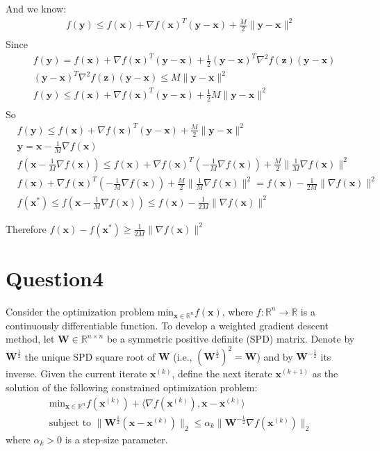 \documentclass{article}
\newcommand{\R}{\mathbb{R}}
\begin{document}
And we know:
\begin{align*}
    f(\bm{y}) \leq f(\bm{x}) + \nabla f(\bm{x})^T (\bm{y} - \bm{x}) + \frac{M}{2} \|\bm{y} - \bm{x}\|^2 \\
\end{align*}
Since 
\begin{align*}
    &f(\bm{y}) = f(\bm{x}) + \nabla f(\bm{x})^T (\bm{y} - \bm{x}) + \frac{1}{2} (\bm{y} - \bm{x})^T \nabla^2 f(\bm{z}) (\bm{y} - \bm{x}) \\
    &(\bm{y} - \bm{x})^T \nabla^2 f(\bm{z}) (\bm{y} - \bm{x}) \leq M \|\bm{y} - \bm{x}\|^2 \\
    &f(\bm{y}) \leq f(\bm{x}) + \nabla f(\bm{x})^T (\bm{y} - \bm{x}) + \frac{1}{2} M \|\bm{y} - \bm{x}\|^2  \\
\end{align*}
So
\begin{align*}
    &f(\bm{y}) \leq f(\bm{x}) + \nabla f(\bm{x})^T (\bm{y} - \bm{x}) + \frac{M}{2} \|\bm{y} - \bm{x}\|^2 \\
    & \bm{y} =  \bm{x} - \frac{1}{M} \nabla f(\bm{x}) \\
    & f(\bm{x} - \frac{1}{M} \nabla f(\bm{x})) \leq f(\bm{x}) + \nabla f(\bm{x})^T (- \frac{1}{M} \nabla f(\bm{x})) + \frac{M}{2} \|\frac{1}{M} \nabla f(\bm{x})\|^2 \\
    & f(\bm{x}) + \nabla f(\bm{x})^T (- \frac{1}{M} \nabla f(\bm{x})) + \frac{M}{2} \|\frac{1}{M} \nabla f(\bm{x})\|^2 = f(\bm{x}) - \frac{1}{2M}\|\nabla f(\bm{x})\|^2 \\
    & f(\bm{x}^*) \leq f(\bm{x} - \frac{1}{M} \nabla f(\bm{x})) \leq f(\bm{x}) - \frac{1}{2M}\|\nabla f(\bm{x})\|^2
\end{align*}

Therefore \(f(\bm{x}) - f(\bm{x}^*) \geq \frac{1}{2M}\|\nabla f(\bm{x})\|^2\)

\section*{Question4}
Consider the optimization problem \(\text{min}_{\bm{x} \in \R^n} f(\bm{x})\), where \(f: \R^n \to \R\) is a continuously differentiable function. To develop a weighted gradient descent method, let \(\bm{W} \in \R^{n \times n}\) be a symmetric positive definite (SPD) matrix. Denote by \(\bm{W}^{\frac{1}{2}}\) the unique SPD square root of \(\bm{W}\) (i.e., \((\bm{W}^{\frac{1}{2}})^2 = \bm{W}\)) and by \(\bm{W}^{-\frac{1}{2}}\) its inverse. Given the current iterate \(\bm{x}^{(k)}\), define the next iterate \(\bm{x}^{(k + 1)}\) as the solution of the following constrained optimization problem:
\begin{align*}
    \text{min}_{\bm{x} \in \R^n}f(\bm{x}^{(k)}) + \langle \nabla f(\bm{x}^{(k)}), \bm{x} - \bm{x}^{(k)}\rangle \\
    \text{subject to } \|\bm{W}^{\frac{1}{2}} (\bm{x} - \bm{x}^(k))\|_2 \leq \alpha_k\|\bm{W}^{-\frac{1}{2}} \nabla f(\bm{x}^(k))\|_2
\end{align*}
where  \(\alpha_k > 0\) is a step-size parameter.
\end{document}
